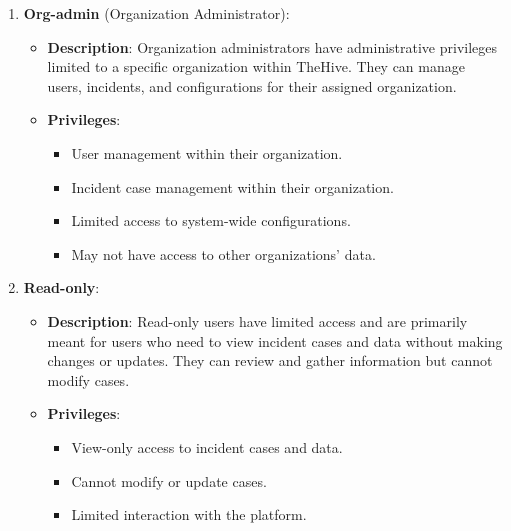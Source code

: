 \documentclass{article}
\begin{document}
\begin{enumerate}
    \item \textbf{Org-admin} (Organization Administrator):
       \begin{itemize}
         \item \textbf{Description}: Organization administrators have administrative privileges limited to a specific organization within TheHive. They can manage users, incidents, and configurations for their assigned organization.
         \item \textbf{Privileges}:
         \begin{itemize}
           \item User management within their organization.
           \item Incident case management within their organization.
           \item Limited access to system-wide configurations.
           \item May not have access to other organizations' data.
         \end{itemize}
       \end{itemize}
  
    \item \textbf{Read-only}:
       \begin{itemize}
         \item \textbf{Description}: Read-only users have limited access and are primarily meant for users who need to view incident cases and data without making changes or updates. They can review and gather information but cannot modify cases.
         \item \textbf{Privileges}:
         \begin{itemize}
           \item View-only access to incident cases and data.
           \item Cannot modify or update cases.
           \item Limited interaction with the platform.
         \end{itemize}
       \end{itemize}
  \end{enumerate}
\end{document}
